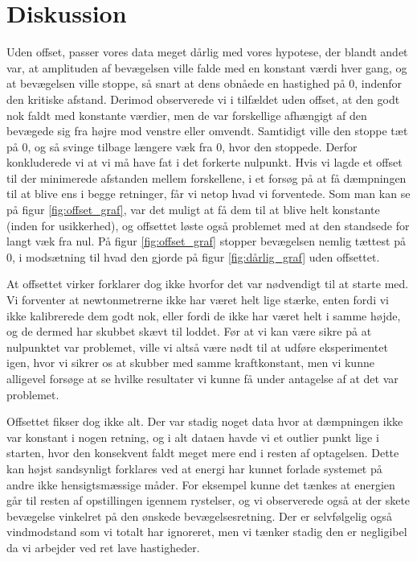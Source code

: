 \chapter{Diskussion}
Uden offset, passer vores data meget dårlig med vores hypotese, der blandt andet var, 
at amplituden af bevægelsen ville falde med en konstant værdi hver gang, og at bevægelsen ville stoppe, 
så snart at dens obnåede en hastighed på 0, indenfor den kritiske afstand. 
Derimod observerede vi i tilfældet uden offset, at den godt nok faldt med konstante værdier, men de var forskellige afhængigt af den bevægede sig fra højre mod venstre eller omvendt.
Samtidigt ville den stoppe tæt på 0, og så svinge tilbage længere væk fra 0, hvor den stoppede. Derfor konkluderede vi at vi må have fat i det forkerte nulpunkt. 
Hvis vi lagde et offset til der minimerede afstanden mellem forskellene, i et forsøg på at få dæmpningen til at blive ens i begge retninger, får vi netop hvad vi forventede. 
Som man kan se på figur \ref{fig:offset_graf}, var det muligt at få dem til at blive helt konstante (inden for usikkerhed), og offsettet løste også problemet med at den standsede for langt væk fra nul. 
På figur \ref{fig:offset_graf} stopper bevægelsen nemlig tættest på 0, i modsætning til hvad den gjorde på figur \ref{fig:dårlig_graf} uden offsettet.

At offsettet virker forklarer dog ikke hvorfor det var nødvendigt til at starte med. Vi forventer at newtonmetrerne ikke har været helt lige stærke, 
enten fordi vi ikke kalibrerede dem godt nok, eller fordi de ikke har været helt i samme højde, og de dermed har skubbet skævt til loddet.
Før at vi kan være sikre på at nulpunktet var problemet, ville vi altså være nødt til at udføre eksperimentet igen, hvor vi sikrer os at skubber med samme kraftkonstant, 
men vi kunne alligevel forsøge at se hvilke resultater vi kunne få under antagelse af at det var problemet. 

Offsettet fikser dog ikke alt. Der var stadig noget data hvor at dæmpningen ikke var konstant i nogen retning, 
og i alt dataen havde vi et outlier punkt lige i starten, hvor den konsekvent faldt meget mere end i resten af optagelsen.
Dette kan højst sandsynligt forklares ved at energi har kunnet forlade systemet på andre ikke hensigtsmæssige måder. 
For eksempel kunne det tænkes at energien går til resten af opstillingen igennem rystelser, og vi observerede også at der skete bevægelse vinkelret på den ønskede bevægelsesretning.
Der er selvfølgelig også vindmodstand som vi totalt har ignoreret, men vi tænker stadig den er negligibel da vi arbejder ved ret lave hastigheder.